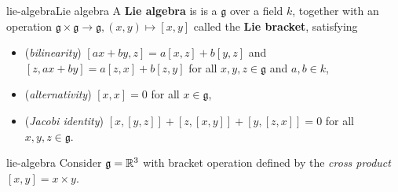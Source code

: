 

\begin{topic}{lie-algebra}{Lie algebra}
    A \textbf{Lie algebra} is is a  $\mathfrak{g}$ over a field $k$, together with an operation $\mathfrak{g} \times \mathfrak{g} \to \mathfrak{g}, (x, y) \mapsto [x, y]$ called the \textbf{Lie bracket}, satisfying
    \begin{itemize}
        \item (\textit{bilinearity}) $[ax + by, z] = a[x, z] + b[y, z]$ and $[z, ax + by] = a[z, x] + b[z, y]$ for all $x, y, z \in \mathfrak{g}$ and $a, b \in k$,
        \item (\textit{alternativity}) $[x, x] = 0$ for all $x \in \mathfrak{g}$,
        \item (\textit{Jacobi identity}) $[x, [y, z]] + [z, [x, y]] + [y, [z, x]] = 0$ for all $x, y, z \in \mathfrak{g}$.
    \end{itemize}
\end{topic}

\begin{example}{lie-algebra}
    Consider $\mathfrak{g} = \mathbb{R}^3$ with bracket operation defined by the \textit{cross product} $[x, y] = x \times y$.
\end{example}

